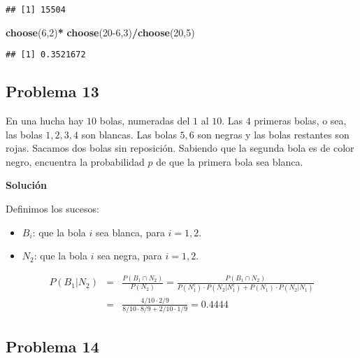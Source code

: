 \documentclass[
]{article}
\newenvironment{Shaded}{\begin{snugshade}}{\end{snugshade}}
\newcommand{\DecValTok}[1]{\textcolor[rgb]{0.00,0.00,0.81}{#1}}
\newcommand{\KeywordTok}[1]{\textcolor[rgb]{0.13,0.29,0.53}{\textbf{#1}}}
\newcommand{\NormalTok}[1]{#1}
\newcommand{\OperatorTok}[1]{\textcolor[rgb]{0.81,0.36,0.00}{\textbf{#1}}}
\newcommand{\StringTok}[1]{\textcolor[rgb]{0.31,0.60,0.02}{#1}}
\providecommand{\tightlist}{%
  \setlength{\itemsep}{0pt}\setlength{\parskip}{0pt}}
\begin{document}
\begin{verbatim}
## [1] 15504
\end{verbatim}

\begin{Shaded}
\begin{Highlighting}[]
\KeywordTok{choose}\NormalTok{(}\DecValTok{6}\NormalTok{,}\DecValTok{2}\NormalTok{)}\OperatorTok{*}\StringTok{ }\KeywordTok{choose}\NormalTok{(}\DecValTok{20-6}\NormalTok{,}\DecValTok{3}\NormalTok{)}\OperatorTok{/}\KeywordTok{choose}\NormalTok{(}\DecValTok{20}\NormalTok{,}\DecValTok{5}\NormalTok{)}
\end{Highlighting}
\end{Shaded}

\begin{verbatim}
## [1] 0.3521672
\end{verbatim}

\hypertarget{problema-13}{%
\subsection{Problema 13}\label{problema-13}}

En una hucha hay \(10\) bolas, numeradas del \(1\) al \(10\). Las \(4\)
primeras bolas, o sea, las bolas \(1,2,3,4\) son blancas. Las bolas
\(5,6\) son negras y las bolas restantes son rojas. Sacamos dos bolas
sin reposición. Sabiendo que la segunda bola es de color negro,
encuentra la probabilidad \(p\) de que la primera bola sea blanca.

\textbf{Solución}

Definimos los sucesos:

\begin{itemize}
\tightlist
\item
  \(B_i\): que la bola \(i\) sea blanca, para \(i=1,2.\)
\item
  \(N_2\): que la bola \(i\) sea negra, para \(i=1,2.\)
\end{itemize}

\begin{eqnarray*}
P(B_1|N_2) &=& \frac{P(B_1 \cap N_2)}{P(N_2)} = 
\frac{P(B_1 \cap N_2)}{P(N_1^c)\cdot P(N_2 |N_1^c) + P(N_1) \cdot P(N_2|N_1)} \\
&=& 
\frac{4/10 \cdot 2/9}{8/10 \cdot 8/9 + 2/10 \cdot 1/9} = 0.4444
\end{eqnarray*}

\hypertarget{problema-14}{%
\subsection{Problema 14}\label{problema-14}}
\end{document}
